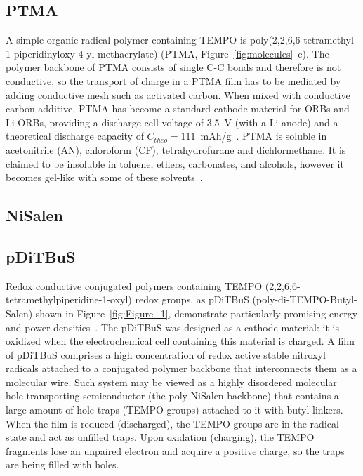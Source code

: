 \subsection{PTMA}

A simple organic radical polymer containing TEMPO is poly(2,2,6,6-tetramethyl-1-piperidinyloxy-4-yl methacrylate) (PTMA, Figure~\ref{fig:molecules}~c). The polymer backbone of PTMA consists of single C-C bonds and therefore is not conductive, so the transport of charge in a PTMA film has to be mediated by adding conductive mesh such as activated carbon. When mixed with conductive carbon additive, PTMA has become a standard cathode material for ORBs and Li-ORBs, providing a discharge cell voltage of 3.5~V (with a Li anode) and a theoretical discharge capacity of $C_{theo}=111$~mAh/g~\cite{Daniel2023_Multimodal}. PTMA is soluble in acetonitrile (AN), chloroform (CF), tetrahydrofurane and dichlormethane. It is claimed to be insoluble in toluene, ethers, carbonates, and alcohols, however it becomes gel-like with some of these solvents~\cite{DOM}.

\subsection{NiSalen}



\subsection{pDiTBuS}
Redox conductive conjugated polymers containing TEMPO (2,2,6,6-tetramethylpiperidine-1-oxyl) redox groups, as pDiTBuS (poly-di-TEMPO-Butyl-Salen) shown in Figure~\ref{fig:Figure_1}, demonstrate particularly promising energy and power densities~\cite{Vereshchagin2020}. The pDiTBuS was designed as a cathode material: it is oxidized when the electrochemical cell containing this material is charged. A film of pDiTBuS comprises a high concentration of redox active stable nitroxyl radicals attached to a conjugated polymer backbone that interconnects them as a molecular wire. Such system may be viewed as a highly disordered molecular hole-transporting semiconductor (the poly-NiSalen backbone) that contains a large amount of hole traps (TEMPO groups) attached to it with butyl linkers. When the film is reduced (discharged), the TEMPO groups are in the radical state and act as unfilled traps. Upon oxidation (charging), the TEMPO fragments lose an unpaired electron and acquire a positive charge, so the traps are being filled with holes.

